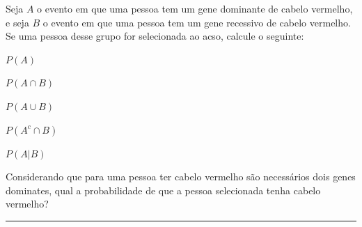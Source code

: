 \documentclass[a4paper,11pt,fleqn]{article}\usepackage[]{graphicx}\usepackage[]{color}
\theoremstyle{definition}
\begin{document}
\begin{compactenum}
  Seja $A$ o evento em que uma pessoa tem um gene dominante de cabelo
  vermelho, e seja $B$ o evento em que uma pessoa tem um gene recessivo
  de cabelo vermelho. Se uma pessoa desse grupo for selecionada ao acso,
  calcule o seguinte:
  \begin{compactenum}
  \item $P(A)$
  \item $P(A \cap B)$
  \item $P(A \cup B)$
  \item $P(A^c \cap B)$
  \item $P(A|B)$
  \item Considerando que para uma pessoa ter cabelo vermelho são
    necessários dois genes dominates, qual a probabilidade de que a
    pessoa selecionada tenha cabelo vermelho?
  \end{compactenum}

\vspace{0.3cm}
\hrule
\vspace{0.3cm}


\end{compactenum}
\end{document}
